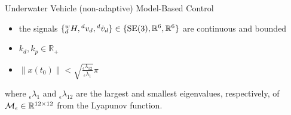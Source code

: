 \begin{frame}[t]{Underwater Vehicle (non-adaptive) Model-Based Control}
{\begin{itemize}
\item the signals $\{{^w_d}H,{^d}v_d,{^d}\dot{v}_d
  \}\in\{\SE3,\realSpace{6},\realSpace{6}\}$ are continuous and bounded
\item $k_d,k_p\in\mathbb{R}_+$
\item $\|x(t_0)\|<\sqrt{
                  \frac{ {_\epsilon}\lambda_{12} }
                       { {_\epsilon}\lambda_1   }
                       } \pi$ 
\end{itemize}

\noindent where ${_\epsilon}\lambda_{1}$ and ${_\epsilon}\lambda_{12}$
are the largest and smallest eigenvalues, respectively, of
$\mathcal{M}_\epsilon\in\mathbb{R}^{12\times 12}$ from the Lyapunov function.}


\end{frame}


